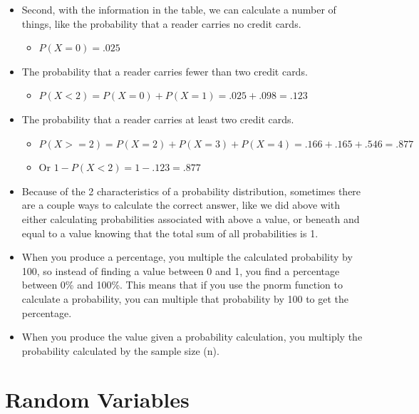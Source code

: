 \documentclass[
  letterpaper,
  DIV=11,
  numbers=noendperiod]{scrreprt}
\providecommand{\tightlist}{%
  \setlength{\itemsep}{0pt}\setlength{\parskip}{0pt}}\usepackage{longtable,booktabs,array}
\begin{document}
\begin{itemize}
\item
  Second, with the information in the table, we can calculate a number
  of things, like the probability that a reader carries no credit cards.

  \begin{itemize}
  \tightlist
  \item
    \(P(X=0)= .025\)
  \end{itemize}
\item
  The probability that a reader carries fewer than two credit cards.

  \begin{itemize}
  \tightlist
  \item
    \(P(X<2)= P(X=0)+P(X=1)= .025 +.098= .123\)
  \end{itemize}
\item
  The probability that a reader carries at least two credit cards.

  \begin{itemize}
  \tightlist
  \item
    \(P(X>=2) = P(X=2)+P(X=3)+P(X=4)  = .166+.165+.546= .877\)
  \item
    Or \(1-P(X<2) = 1-.123 = .877\)
  \end{itemize}
\item
  Because of the 2 characteristics of a probability distribution,
  sometimes there are a couple ways to calculate the correct answer,
  like we did above with either calculating probabilities associated
  with above a value, or beneath and equal to a value knowing that the
  total sum of all probabilities is 1.
\item
  When you produce a percentage, you multiple the calculated probability
  by 100, so instead of finding a value between 0 and 1, you find a
  percentage between 0\% and 100\%. This means that if you use the pnorm
  function to calculate a probability, you can multiple that probability
  by 100 to get the percentage.
\item
  When you produce the value given a probability calculation, you
  multiply the probability calculated by the sample size (n).
\end{itemize}

\section{Random Variables}\label{random-variables}
\end{document}
